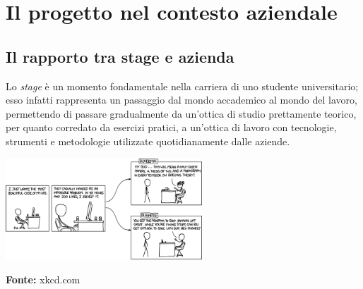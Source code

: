 
\chapter{Il progetto nel contesto aziendale}
\label{cap:progetto-contesto-aziendale}

\section{Il rapporto tra stage e azienda}

Lo \textit{stage} è un momento fondamentale nella carriera di uno studente universitario; esso infatti rappresenta un passaggio dal mondo accademico al mondo del lavoro, permettendo di passare gradualmente da un'ottica di studio prettamente teorico, per quanto corredato da esercizi pratici, a un'ottica di lavoro con tecnologie, strumenti e metodologie utilizzate quotidianamente dalle aziende. \\

\begin{minipage}{\linewidth}
  \centering
    \includegraphics[height=3.8cm]{immagini/academiavsbusiness}
  \caption*{\textbf{Fonte:} xkcd.com}
\end{minipage} \\

